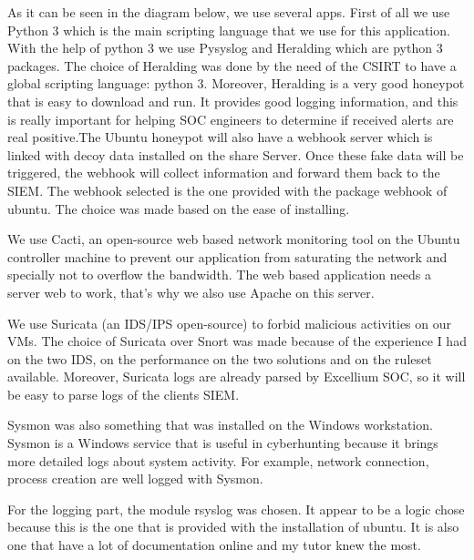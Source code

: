 \documentclass{tnreport}
\begin{document}
As it can be seen in the diagram below, we use several apps.
First of all we use Python 3 which is the main scripting language that we use for this application. With the help of python 3 we use Pysyslog and Heralding which are python 3 packages. The choice of Heralding was done by the need of the \gls{CSIRT} to have a global scripting language: python 3. Moreover, Heralding is a very good honeypot that is easy to download and run. It provides good logging information, and this is really important for helping \gls{SOC} engineers to determine if received alerts are real positive.\eol The Ubuntu honeypot will also have a webhook server which is linked with decoy data installed on the share Server. Once these fake data will be triggered, the webhook will collect information and forward them back to the \gls{SIEM}. The webhook selected is the one provided with the package webhook of ubuntu. The choice was made based on the ease of installing.

We use Cacti, an open-source web based network monitoring tool on the Ubuntu controller machine to prevent our application from saturating the network and specially not to overflow the bandwidth. The web based application needs a server web to work, that's why we also use Apache on this server.

We use Suricata (an \gls{IDS}/\gls{IPS} open-source) to forbid malicious activities on our VMs. The choice of Suricata over Snort was made because of the experience I had on the two \gls{IDS}, on the performance on the two solutions and on the ruleset available. Moreover, Suricata logs are already parsed by Excellium \gls{SOC}, so it will be easy to parse logs of the clients \gls{SIEM}.

Sysmon was also something that was installed on the Windows workstation. Sysmon is a Windows service that is useful in cyberhunting because it brings more detailed logs about system activity. For example, network connection, process creation are well logged with Sysmon. 

For the logging part, the module rsyslog was chosen. It appear to be a logic chose because this is the one that is provided with the installation of ubuntu. It is also one that have a lot of documentation online and my tutor knew the most.
\end{document}
